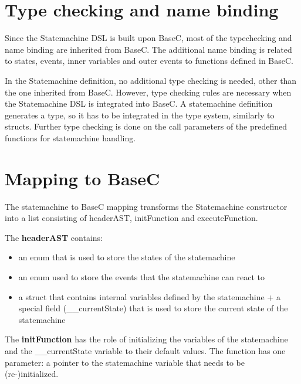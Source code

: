 \documentclass[a4paper,10pt,titlepage]{report}
\begin{document}
\section{Type checking and name binding}
Since the Statemachine DSL is built upon BaseC, most of the typechecking and name binding are inherited from BaseC. The additional name binding is related to states, events, inner variables and outer events to functions defined in BaseC. 

In the Statemachine definition, no additional type checking is needed, other than the one inherited from BaseC. However, type checking rules are necessary when the Statemachine DSL is integrated into BaseC. A statemachine definition generates a type, so it has to be integrated in the type system, similarly to structs. Further type checking is done on the call parameters of the predefined functions for statemachine handling.

\section{Mapping to BaseC}

The statemachine to BaseC mapping transforms the Statemachine constructor into a list consisting of headerAST, initFunction and executeFunction. 

The \textbf{headerAST} contains:
\begin{itemize}
\item an enum that is used to store the states of the statemachine 
\item an enum used to store the events that the statemachine can react to
\item a struct that contains internal variables defined by the statemachine + a special field (\_\_currentState) that is used to store the current state of the statemachine
\end{itemize}

The \textbf{initFunction} has the role of initializing the variables of the statemachine and the \_\_currentState variable to their default values. The function has one parameter: a pointer to the statemachine variable that needs to be (re-)initialized.
\end{document}
